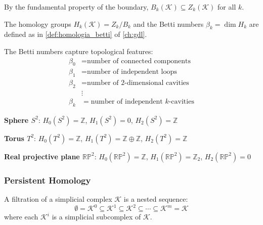 By the fundamental property of the boundary, $B_k(\mathcal{K}) \subseteq Z_k(\mathcal{K})$ for all $k$.

The homology groups $H_k(\mathcal{K}) = Z_k/B_k$ and the Betti numbers $\beta_k = \dim H_k$ are defined as in \autoref{def:homologia_betti} of \autoref{ch:gdl}.\label{def:grupos_homologia}\label{def:numeros_betti}

\begin{remark}\label{rem:interpretacion_betti}
The Betti numbers capture topological features:
\begin{align}
    \beta_0 &= \text{number of connected components} \\
    \beta_1 &= \text{number of independent loops} \\
    \beta_2 &= \text{number of 2-dimensional cavities} \\
    &\vdots \\
    \beta_k &= \text{number of independent } k\text{-cavities}
\end{align}
\end{remark}

\begin{example}\label{ex:homologia_basicas}
\textbf{Sphere $S^2$}: $H_0(S^2) = \mathbb{Z}$, $H_1(S^2) = 0$, $H_2(S^2) = \mathbb{Z}$

\textbf{Torus $T^2$}: $H_0(T^2) = \mathbb{Z}$, $H_1(T^2) = \mathbb{Z} \oplus \mathbb{Z}$, $H_2(T^2) = \mathbb{Z}$

\textbf{Real projective plane $\mathbb{RP}^2$}: $H_0(\mathbb{RP}^2) = \mathbb{Z}$, $H_1(\mathbb{RP}^2) = \mathbb{Z}_2$, $H_2(\mathbb{RP}^2) = 0$
\end{example}

\subsubsection{Persistent Homology}

\begin{definition}[Filtration]\label{def:filtracion}
A filtration of a simplicial complex $\mathcal{K}$ is a nested sequence:
\begin{equation}
    \emptyset = \mathcal{K}^0 \subseteq \mathcal{K}^1 \subseteq \mathcal{K}^2 \subseteq \cdots \subseteq \mathcal{K}^m = \mathcal{K}
\end{equation}
where each $\mathcal{K}^i$ is a simplicial subcomplex of $\mathcal{K}$.
\end{definition}

